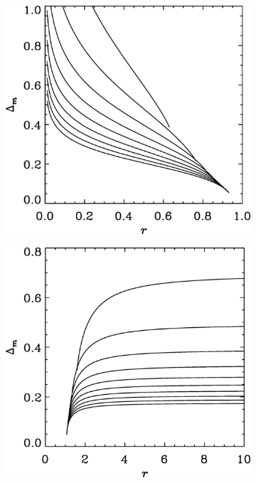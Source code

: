 \begin{figure}
    \centering
    \begin{subfigure}[b]{0.49\textwidth}
        \centering
        \includegraphics[width=\textwidth]{figures/Delta_m_inner.jpeg}
        \label{fig:delta_m_inner}
    \end{subfigure}
    \hfill
    \begin{subfigure}[b]{0.49\textwidth}
        \centering
        \includegraphics[width=\textwidth]{figures/Delta_m_outer.jpeg}
        \label{fig:delta_m_outer}
    \end{subfigure}
       \caption{}
       \label{fig:delta_m}
\end{figure}

